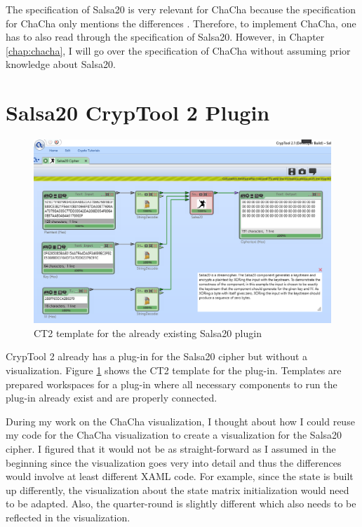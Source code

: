 The specification of Salsa20 is very relevant for ChaCha because the specification for ChaCha only mentions the differences \cite{chachaspec}. Therefore, to implement ChaCha, one has to also read through the specification of Salsa20.  However, in Chapter \ref{chap:chacha}, I will go over the specification of ChaCha without assuming prior knowledge about Salsa20.


\section{Salsa20 CrypTool 2 Plugin}
\label{sec:salsaCT2Plugin}

\begin{figure}
\centering
\includegraphics[width=\textwidth]{figures/ct2/salsa-crop.png}
\caption[Salsa20 CT2 template]{CT2 template for the already existing Salsa20 plugin}
\label{fig:salsa.template}
\end{figure}

CrypTool 2 already has a plug-in for the Salsa20 cipher but without a visualization. Figure \ref{fig:salsa.template} shows the CT2 template for the plug-in. Templates are prepared workspaces for a plug-in where all necessary components to run the plug-in already exist and are properly connected.

During my work on the ChaCha visualization, I thought about how I could reuse my code for the ChaCha visualization to create a visualization for the Salsa20 cipher. I figured that it would not be as straight-forward as I assumed in the beginning since the visualization goes very into detail and thus the differences would involve at least different XAML code. For example, since the state is built up differently, the visualization about the state matrix initialization would need to be adapted. Also, the quarter-round is slightly different which also needs to be reflected in the visualization. 

